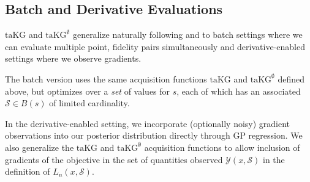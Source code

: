\documentclass[letterpaper]{article}
\newcommand{\VOIE}{\text{VOI}^\emptyset}
\newcommand{\taKG}{\text{taKG}}
\newcommand{\taKGE}{\text{taKG}^\emptyset}
\numberwithin{equation}{section}
\renewcommand{\S}{\mathcal{S}}
\newcommand{\eqn}[1]{(\ref{eqn:#1})}
\newcommand{\Y}{\mathcal{Y}}
\begin{document}


\subsection{Batch and Derivative Evaluations}
\label{sect:extensions}
$\taKG$ and $\taKGE$ generalize naturally 
following \citet{wu2016parallel} and \citet{wu2017bayesian}
to batch settings where we can evaluate multiple point, fidelity pairs simultaneously and derivative-enabled settings where we observe gradients. 

The batch version uses the same acquisition functions $\taKG$ and $\taKGE$ defined above, but optimizes over a {\it set} of values for $s$, each of which has an associated $\S \in B(s)$ of limited cardinality.

In the derivative-enabled setting, we incorporate (optionally noisy) gradient observations into our posterior distribution directly through GP regression.  We also generalize the $\taKG$ and $\taKGE$ acquisition functions to allow inclusion of gradients of the objective in the set of quantities observed $\Y(x,\S)$ in the definition of $L_n(x,\S)$.
\end{document}
